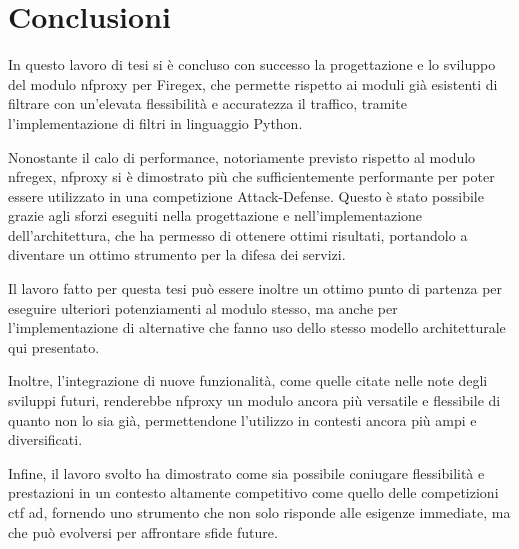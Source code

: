 \chapter*{Conclusioni}\label{chap:ending}

In questo lavoro di tesi si è concluso con successo la progettazione e lo sviluppo del modulo \gls{nfproxy} per Firegex, che permette rispetto ai moduli già esistenti di filtrare con un'elevata flessibilità e accuratezza il traffico, tramite l'implementazione di filtri in linguaggio Python.

Nonostante il calo di performance, notoriamente previsto rispetto al modulo \gls{nfregex}, \gls{nfproxy} si è dimostrato più che sufficientemente performante per poter essere utilizzato in una competizione Attack-Defense. Questo è stato possibile grazie agli sforzi eseguiti nella progettazione e nell'implementazione dell'architettura, che ha permesso di ottenere ottimi risultati, portandolo a diventare un ottimo strumento per la difesa dei servizi.

Il lavoro fatto per questa tesi può essere inoltre un ottimo punto di partenza per eseguire ulteriori potenziamenti al modulo stesso, ma anche per l'implementazione di alternative che fanno uso dello stesso modello architetturale qui presentato.

Inoltre, l'integrazione di nuove funzionalità, come quelle citate nelle note degli sviluppi futuri, renderebbe \gls{nfproxy} un modulo ancora più versatile e flessibile di quanto non lo sia già, permettendone l'utilizzo in contesti ancora più ampi e diversificati.

Infine, il lavoro svolto ha dimostrato come sia possibile coniugare flessibilità e prestazioni in un contesto altamente competitivo come quello delle competizioni \gls{ctf} \gls{ad}, fornendo uno strumento che non solo risponde alle esigenze immediate, ma che può evolversi per affrontare sfide future.

